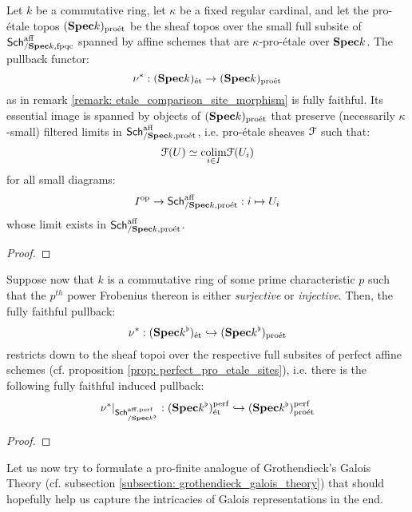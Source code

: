                 \begin{proposition}
                    Let $k$ be a commutative ring, let $\kappa$ be a fixed regular cardinal, and let the pro-\'etale topos $(\mathbf{Spec} k)_{\mathrm{pro\acute{e}t}}$ be the sheaf topos over the small full subsite of $\mathsf{Sch}^{\mathrm{aff}}_{/\mathbf{Spec} k, \mathrm{fpqc}}$ spanned by affine schemes that are $\kappa$-pro-\'etale over $\mathbf{Spec} k$. The pullback functor:
                        $$\nu^*: (\mathbf{Spec} k)_{\mathrm{\acute{e}t}} \to (\mathbf{Spec} k)_{\mathrm{pro\acute{e}t}}$$
                    as in remark \ref{remark: etale_comparison_site_morphism} is fully faithful. Its essential image is spanned by objects of $(\mathbf{Spec} k)_{\mathrm{pro\acute{e}t}}$ that preserve (necessarily $\kappa$-small) filtered limits in $\mathsf{Sch}^{\mathrm{aff}}_{/\mathbf{Spec} k, \mathrm{pro\acute{e}t}}$, i.e. pro-\'etale sheaves $\mathcal{F}$ such that:
                        $$\mathcal{F}(U) \simeq \underset{i \in I}{\operatorname{colim}} \mathcal{F}(U_i)$$
                    for all small diagrams:
                        $$I^{\mathrm{op}} \to \mathsf{Sch}^{\mathrm{aff}}_{/\mathbf{Spec} k, \mathrm{pro\acute{e}t}}: i \mapsto U_i$$
                    whose limit exists in $\mathsf{Sch}^{\mathrm{aff}}_{/\mathbf{Spec} k, \mathrm{pro\acute{e}t}}$. 
                \end{proposition}
                    \begin{proof}
                        
                    \end{proof}
                \begin{corollary}
                    Suppose now that $k$ is a commutative ring of some prime characteristic $p$ such that the $p^{th}$ power Frobenius thereon is either \textit{surjective} or \textit{injective}. Then, the fully faithful pullback:
                        $$\nu^*: (\mathbf{Spec} k^{\flat})_{\mathrm{\acute{e}t}} \hookrightarrow (\mathbf{Spec} k^{\flat})_{\mathrm{pro\acute{e}t}}$$
                    restricts down to the sheaf topoi over the respective full subsites of perfect affine schemes (cf. proposition \ref{prop: perfect_pro_etale_sites}), i.e. there is the following fully faithful induced pullback:
                        $$\nu^*|_{\mathsf{Sch}^{\mathrm{aff}, \mathrm{perf}}_{/\mathbf{Spec} k^{\flat}}}: (\mathbf{Spec} k^{\flat})^{\mathrm{perf}}_{\mathrm{\acute{e}t}} \hookrightarrow (\mathbf{Spec} k^{\flat})^{\mathrm{perf}}_{\mathrm{pro\acute{e}t}}$$
                \end{corollary}
                    \begin{proof}
                        
                    \end{proof}
                
                Let us now try to formulate a pro-finite analogue of Grothendieck's Galois Theory (cf. subsection \ref{subsection: grothendieck_galois_theory}) that should hopefully help us capture the intricacies of Galois representations in the end.
                
